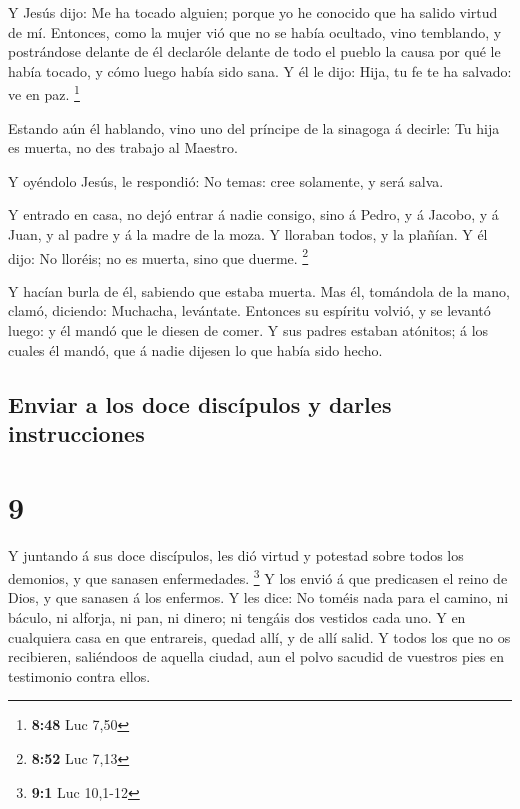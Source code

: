  Y Jesús dijo: Me ha tocado alguien; porque yo he conocido
que ha salido virtud de mí.  Entonces, como la mujer vió
que no se había ocultado, vino temblando, y postrándose delante de él
declaróle delante de todo el pueblo la causa por qué le había tocado, y
cómo luego había sido sana.  Y él le dijo: Hija, tu fe te
ha salvado: ve en paz. \footnote{\textbf{8:48} Luc 7,50}

 Estando aún él hablando, vino uno del príncipe de la
sinagoga á decirle: Tu hija es muerta, no des trabajo al Maestro.

 Y oyéndolo Jesús, le respondió: No temas: cree solamente,
y será salva.

 Y entrado en casa, no dejó entrar á nadie consigo, sino á
Pedro, y á Jacobo, y á Juan, y al padre y á la madre de la moza.
 Y lloraban todos, y la plañían. Y él dijo: No lloréis; no
es muerta, sino que duerme. \footnote{\textbf{8:52} Luc 7,13}

 Y hacían burla de él, sabiendo que estaba muerta.
 Mas él, tomándola de la mano, clamó, diciendo: Muchacha,
levántate.  Entonces su espíritu volvió, y se levantó
luego: y él mandó que le diesen de comer.  Y sus padres
estaban atónitos; á los cuales él mandó, que á nadie dijesen lo que
había sido hecho.

\hypertarget{enviar-a-los-doce-discuxedpulos-y-darles-instrucciones}{%
\subsection{Enviar a los doce discípulos y darles
instrucciones}\label{enviar-a-los-doce-discuxedpulos-y-darles-instrucciones}}

\hypertarget{section-8}{%
\section{9}\label{section-8}}

 Y juntando á sus doce discípulos, les dió virtud y potestad
sobre todos los demonios, y que sanasen enfermedades. \footnote{\textbf{9:1}
  Luc 10,1-12}  Y los envió á que predicasen el reino de
Dios, y que sanasen á los enfermos.  Y les dice: No toméis
nada para el camino, ni báculo, ni alforja, ni pan, ni dinero; ni
tengáis dos vestidos cada uno.  Y en cualquiera casa en que
entrareis, quedad allí, y de allí salid.  Y todos los que no
os recibieren, saliéndoos de aquella ciudad, aun el polvo sacudid de
vuestros pies en testimonio contra ellos.

